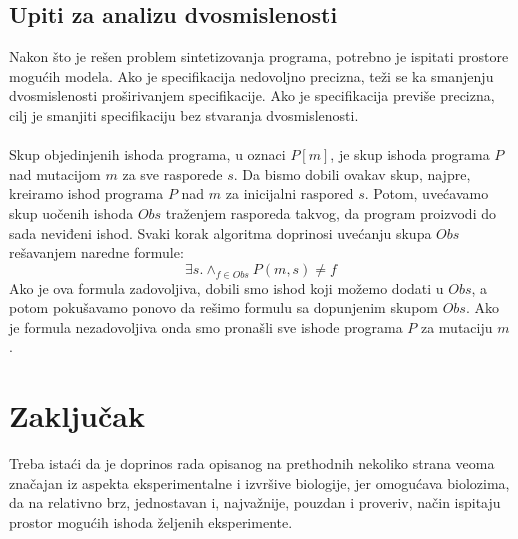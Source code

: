 \documentclass[a4paper]{article}
\begin{document}
\subsection{Upiti za analizu dvosmislenosti}
Nakon što je rešen problem sintetizovanja programa, potrebno je ispitati prostore mogućih modela. Ako je specifikacija nedovoljno precizna, teži se ka smanjenju dvosmislenosti proširivanjem specifikacije. Ako je specifikacija previše precizna, cilj je smanjiti specifikaciju bez stvaranja dvosmislenosti.\\\\

Skup objedinjenih ishoda programa, u oznaci $P[m]$, je skup ishoda programa $P$ nad mutacijom $m$ za sve rasporede $s$. Da bismo dobili ovakav skup, najpre, kreiramo ishod programa $P$ nad $m$ za inicijalni raspored $s$. Potom, uvećavamo skup uočenih ishoda $Obs$ traženjem rasporeda takvog, da program proizvodi do sada neviđeni ishod. Svaki korak algoritma doprinosi uvećanju skupa $Obs$ rešavanjem naredne formule:
\begin{equation}
\exists s. \wedge_{f \in Obs} P(m,s) \neq f
\end{equation}
Ako je ova formula zadovoljiva, dobili smo ishod koji možemo dodati u $Obs$, a potom pokušavamo ponovo da rešimo formulu sa dopunjenim skupom $Obs$. Ako je formula nezadovoljiva onda smo pronašli sve ishode programa $P$ za mutaciju $m$.

\section{Zaključak}
\label{sec:zakljucak}
Treba istaći da je doprinos rada opisanog na prethodnih nekoliko strana veoma značajan iz aspekta eksperimentalne i izvršive biologije, jer omogućava biolozima, da na relativno brz, jednostavan i, najvažnije, pouzdan i proveriv, način ispitaju prostor mogućih ishoda željenih eksperimente.


\appendix
 

\end{document}
